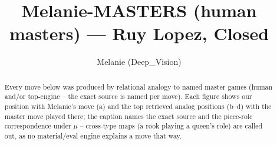 \documentclass[11pt]{article}
\title{Melanie-MASTERS (human masters) — Ruy Lopez, Closed}
\author{Melanie (Deep\_Vision)}
\date{}
\begin{document}
\maketitle

\begin{abstract}Every move below was produced by relational analogy to named master games (human and/or top-engine -- the exact source is named per move). Each figure shows our position with Melanie's move (a) and the top retrieved analog positions (b--d) with the master move played there; the caption names the exact source and the piece-role correspondence under $\mu$ -- cross-type maps (a rook playing a queen's role) are called out, as no material/eval engine explains a move that way.\end{abstract}

\begin{figure}[p]\centering
\begin{subfigure}{0.46\textwidth}\centering
\resizebox{\linewidth}{!}{%
\newchessgame
\chessboard[
  setfen={r1bqk2r/2p1bppp/p1np1n2/1p2p3/4P3/1BN2N2/PPPP1PPP/R1BQR1K1 b kq - 1 8},
  showmover=false,
  pgfstyle=straightmove, color=movearrow, markmove={e8-g8}
]}
\caption{}
\end{subfigure}\hfill
\begin{subfigure}{0.46\textwidth}\centering
\resizebox{\linewidth}{!}{%
\newchessgame
\chessboard[
  setfen={r1b2rk1/pp1nbppp/1q1p1n2/2pPp3/2P1P3/2NB1N1P/PP1B1PP1/R2QK2R w KQ - 3 11},
  showmover=false,
  pgfstyle=straightmove, color=movearrow, markmove={e1-g1}
]}
\caption{}
\end{subfigure}
\\[4pt]
\begin{subfigure}{0.46\textwidth}\centering
\resizebox{\linewidth}{!}{%
\newchessgame
\chessboard[
  setfen={r1bq1rk1/1p2ppbp/2np1np1/p7/2P1P3/1NN1BP2/PP1QB1PP/R3K2R w KQ - 0 12},
  showmover=false,
  pgfstyle=straightmove, color=movearrow, markmove={e1-g1}
]}
\caption{}
\end{subfigure}\hfill
\begin{subfigure}{0.46\textwidth}\centering
\resizebox{\linewidth}{!}{%
\newchessgame
\chessboard[
  setfen={r1bq1rk1/2p1bpp1/p1np1n1p/1p6/4PB2/2NB1N2/PPPQ1PPP/1K1R3R b - - 1 11},
  showmover=false,
  pgfstyle=straightmove, color=movearrow, markmove={c8-e6}
]}
\caption{}
\end{subfigure}

\end{figure}
\end{document}
